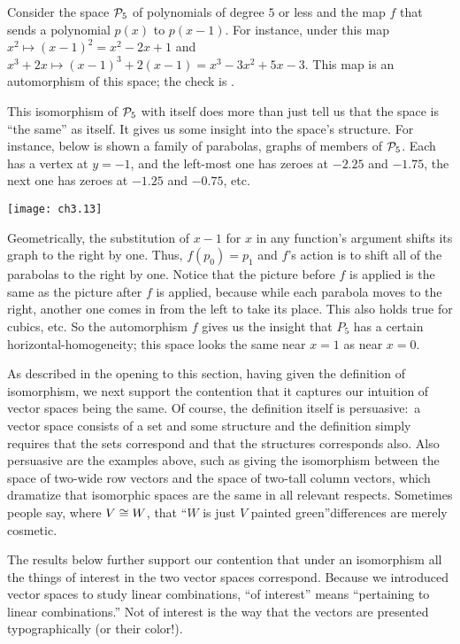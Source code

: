\begin{example} \label{ex:OORThreeToFourLinCom}
Consider the space $\mathcal{P}_5$ of polynomials of degree $5$
or less and the map $f$ that sends a polynomial $p(x)$ to $p(x-1)$.
For instance, under this map $x^2\mapsto (x-1)^2=x^2-2x+1$
and $x^3+2x\mapsto (x-1)^3+2(x-1)=x^3-3x^2+5x-3$.
This map is an automorphism of this space;
the check is .

This isomorphism of $\mathcal{P}_5$ with itself does more than just tell us
that the space is ``the same'' as itself.
It gives us some insight into the space's structure.
For instance, below is shown a family of parabolas, graphs of members of 
$\mathcal{P}_5$.
Each has a vertex at $y=-1$, and  
the left-most one has zeroes at $-2.25$ and $-1.75$, 
the next one has zeroes at $-1.25$ and $-0.75$, etc.
\begin{center}
  \texttt{[image: ch3.13]}                                
\end{center}
Geometrically, the substitution of \( x-1 \) for \( x \) in any function's
argument shifts its graph to the right by one.
Thus, $f(p_0)=p_1$ and 
$f$'s action is to shift all of the parabolas to the right by one.
Notice that the picture before $f$ is applied is the same as the 
picture after $f$ is applied, because while each parabola moves to the 
right, another one comes in from the left to take its place.
This also holds true for cubics, etc.
So the automorphism $f$ gives us the insight that $P_5$  
has a certain
horizontal-homogeneity; this space looks the same near $x=1$ as near $x=0$. 
\end{example}

As described in the opening to this section, 
having given the definition of isomorphism, we next 
support the
contention that it  
captures our intuition of vector spaces being the same.
Of course, the definition itself is persuasive:~a vector space 
consists of a set and some structure 
and the definition simply requires
that the sets correspond and that the structures corresponds also.
Also persuasive are the examples above, such as
giving the isomorphism between the space of two-wide row vectors and 
the space of two-tall column vectors, which
dramatize that isomorphic spaces are
the same in all relevant respects.
Sometimes people say, where \( V\cong W \), that ``\( W \) is just
\( V \) painted green''\Dash differences are merely cosmetic.

The results below further support our contention
that under an isomorphism
all the things of interest in the two vector spaces
correspond.
Because we introduced vector spaces to study linear combinations,
``of interest'' means ``pertaining to linear combinations.''
Not of interest is the way that the vectors are presented
typographically (or their color!).


